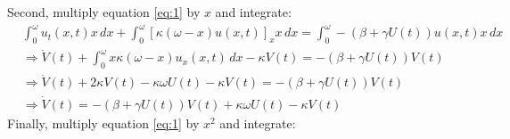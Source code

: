 \documentclass{article}
\begin{document}
Second, multiply equation \ref{eq:1} by $x$ and integrate:
\begin{subequations}
  \begin{align}
    &\int_0^{\omega} u_t(x,t)x\,dx + \int_0^{\omega} [\kappa(\omega-x)u(x,t)]_x x \, dx = \int_0^{\omega} -(\beta+\gamma U(t)) u(x,t)x\, dx\\
    &\Rightarrow \dot{V}(t) + \int_0^{\omega} x\kappa(\omega-x)u_x(x,t)\,dx - \kappa V(t) = -(\beta+\gamma U(t)) V(t)\\%
    &\Rightarrow\dot{V}(t) + 2\kappa V(t) - \kappa \omega U(t) - \kappa V(t) = -(\beta+\gamma U(t)) V(t)\\
    &\Rightarrow \dot{V}(t) = -(\beta+\gamma U(t)) V(t) + \kappa \omega U(t) - \kappa V(t)
  \end{align}
\end{subequations}
Finally, multiply equation \ref{eq:1} by $x^2$ and integrate:
\end{document}
